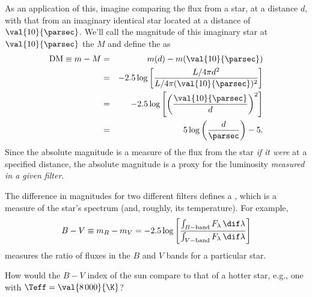 As an application of this, imagine comparing the flux from a star, at a distance $d$, with that from an imaginary identical star located at a distance of $\val{10}{\parsec}$. We'll call the magnitude of this imaginary star at $\val{10}{\parsec}$ the  $M$ and define the  as
\begin{eqnarray}
\mathrm{DM} \equiv m-M &=& m(d) - m(\val{10}{\parsec})\nonumber\\
&=& -2.5\log\left[\frac{L/4\pi d^{2}}{L/4\pi(\val{10}{\parsec})^{2}}\right]\nonumber\\
&=& -2.5\log\left[\left(\frac{\val{10}{\parsec}}{d}\right)^{2}\right]\nonumber \\
&=& 5\log\left(\frac{d}{\parsec}\right) - 5.
\end{eqnarray}
Since the absolute magnitude is a measure of the flux from the star \emph{if it were} at a specified distance, the absolute magnitude is a proxy for the luminosity \emph{measured in a given filter}.

 The difference in magnitudes for two different filters defines a , which is a measure of the star's spectrum (and, roughly, its temperature). For example,
\[
	B - V \equiv m_{B}-m_{V} = -2.5\log\left[\frac{\int_{B-\mathrm{band}}F_{\lambda}\,\dif\lambda}{\int_{V-\mathrm{band}}F_{\lambda}\,\dif\lambda}\right]
\]
measures the ratio of fluxes in the $B$ and $V$ bands for a particular star.

\begin{exercisebox}
How would the $B-V$ index of the sun compare to that of a hotter star, e.g., one with $\Teff = \val{8\,000}{\K}$?
\end{exercisebox}

